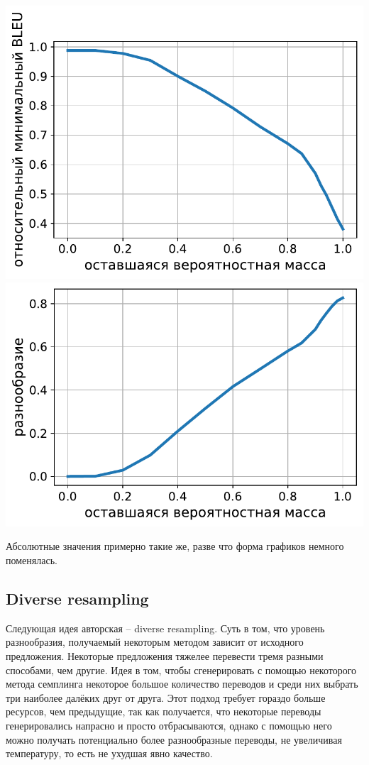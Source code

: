 \documentclass[a4paper, 12pt]{extarticle}
\begin{document}
\begin{center}
\includegraphics[scale=0.5]{min-bleu-nucleus-sampling.pdf}
\includegraphics[scale=0.5]{diversity-nucleus-sampling.pdf}
\end{center}

Абсолютные значения примерно такие же, разве что форма графиков немного поменялась.

\subsection{Diverse resampling}
    Следующая идея авторская -- diverse resampling. Суть в том, что уровень разнообразия, получаемый некоторым методом зависит от исходного предложения. Некоторые предложения тяжелее перевести тремя разными способами, чем другие. Идея в том, чтобы сгенерировать с помощью некоторого метода семплинга некоторое большое количество переводов и среди них выбрать три наиболее далёких друг от друга. Этот подход требует гораздо больше ресурсов, чем предыдущие, так как получается, что некоторые переводы генерировались напрасно и просто отбрасываются, однако с помощью него можно получать потенциально более разнообразные переводы, не увеличивая температуру, то есть не ухудшая явно качество.
\end{document}
